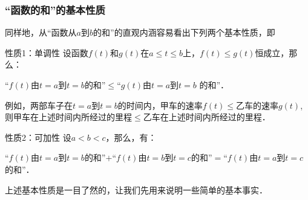 \subsubsection{“函数的和”的基本性质}

同样地，从“函数从$a$到$b$的和”的直观内涵容易看出下列两个基本性质，即

\begin{blk}{性质1：单调性}
设函数$f(t)$和$g(t)$在$a\le t\le b$上，$f(t)\le g(t)$恒成立，那么：

“$f(t)$由$t=a$到$t=b$的和”$\le $“$g(t)$由$t=a$到$t=b$
的和”．
\end{blk}

例如，两部车子在$t=a$到$t=b$的时间内，甲车的速率$f(t)\le $乙车的速率$g(t)$, 则甲车在上述时间内所经过的里程$\le $乙车在上述时间内所经过的里程．

\begin{blk}{性质2：可加性}
设$a<b<c$，那么，有：

“$f(t)$由$t=a$到$t=b$的和”$+$“$f(t)$由$t=b$到$t=c$的和”$=$“$f(t)$由$t=a$到$t=c$的和”．
\end{blk}

上述基本性质是一目了然的，让我们先用来说明一些简单的基本事实．

